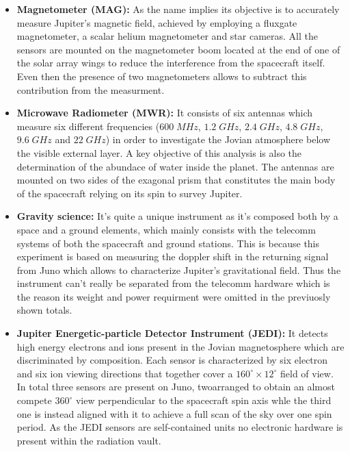 \begin{itemize}
    \item \textbf{Magnetometer (MAG):} As the name implies its objective is to accurately measure Jupiter's magnetic field, achieved by employing a fluxgate magnetometer, a scalar helium magnetometer and star cameras. All the sensors are mounted on the magnetometer boom located at the end of one of the solar array wings to reduce the interference from the spacecraft itself. Even then the presence of two magnetometers allows to subtract this contribution from the measurment.
    
    \item \textbf{Microwave Radiometer (MWR):} It consists of six antennas which measure six different frequencies ($600 \;MHz$, $1.2 \;GHz$, $2.4 \;GHz$, $4.8 \;GHz$, $9.6 \;GHz$ and $22 \;GHz$) in order to investigate the Jovian atmosphere below the visible external layer. A key objective of this analysis is also the determination of the abundace of water inside the planet. The antennas are mounted on two sides of the exagonal prism that constitutes the main body of the spacecraft relying on its spin to survey Jupiter.
    
    \item \textbf{Gravity science:} It's quite a unique instrument as it's composed both by a space and a ground elements, which mainly consists with the telecomm systems of both the spacecraft and ground stations. This is because this experiment is based on measuring the doppler shift in the returning signal from Juno which allows to characterize Jupiter's gravitational field. Thus the instrument can't really be separated from the telecomm hardware which is the reason its weight and power requirment were omitted in the previuosly shown totals.
    
    \item \textbf{Jupiter Energetic-particle Detector Instrument (JEDI):} It detects high energy electrons and ions present in the Jovian magnetosphere which are discriminated by composition. Each sensor is characterized by six electron and six ion viewing directions that together cover a $160^{\circ} \times 12^{\circ}$ field of view. In total three sensors are present on Juno, twoarranged to obtain an almost compete $360^{\circ}$ view perpendicular to the spacecraft spin axis whle the third one is instead aligned with it to achieve a full scan of the sky over one spin period. As the JEDI sensors are self-contained units no electronic hardware is present within the radiation vault.


\end{itemize}
